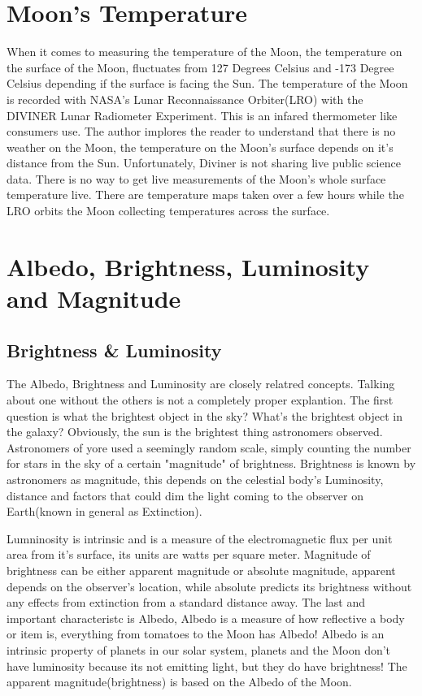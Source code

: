 \documentclass[12pt,oneside,a4paper,english]{article}
\begin{document}
\section{Moon's Temperature}
When it comes to measuring the temperature of the Moon, the temperature on the surface of the Moon, fluctuates from 127 Degrees Celsius and -173 Degree Celsius depending if the surface is facing the Sun. The temperature of the Moon is recorded with NASA's Lunar Reconnaissance Orbiter(LRO) with the DIVINER Lunar Radiometer Experiment. This is an infared thermometer like consumers use. The author implores the reader to understand that there is no weather on the Moon, the temperature on the Moon's surface depends on it's distance from the Sun. Unfortunately, Diviner is not sharing live public science data. There is no way to get live measurements of the Moon's whole surface temperature live. There are temperature maps taken over a few hours while the LRO orbits the Moon collecting temperatures across the surface. 

\section{Albedo, Brightness, Luminosity and Magnitude}
\subsection{Brightness \& Luminosity}
The Albedo, Brightness and Luminosity are closely relatred concepts. Talking about one without the others is not a completely proper explantion. The first question is what the brightest object in the sky? What's the brightest object in the galaxy? Obviously, the sun is the brightest thing astronomers observed. Astronomers of yore used a seemingly random scale, simply counting the number for stars in the sky of a certain "magnitude" of brightness. Brightness is known by astronomers as magnitude, this depends on the celestial body's Luminosity, distance and factors that could dim the light coming to the observer on Earth(known in general as Extinction). 

Lumninosity is intrinsic and is a measure of the electromagnetic flux per unit area from it's surface, its units are watts per square meter. Magnitude of brightness can be either apparent magnitude or absolute magnitude, apparent depends on the observer's location, while absolute predicts its brightness without any effects from extinction from a standard distance away. The last and important characteristc is Albedo, Albedo is a measure of how reflective a body or item is, everything from tomatoes to the Moon has Albedo! Albedo is an intrinsic property of planets in our solar system, planets and the Moon don't have luminosity because its not emitting light, but they do have brightness! The apparent magnitude(brightness) is based on the Albedo of the Moon.
\end{document}
